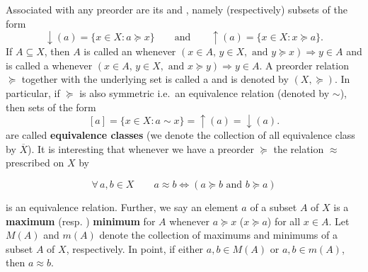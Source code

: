 \documentclass[
  letterpaper,
  10pt,
  reqno,
  twopage,
  openany]{book}
\theoremstyle{plain}
\theoremstyle{definition}
\theoremstyle{definition}
\theoremstyle{definition}
\theoremstyle{plain}
\theoremstyle{plain}
\theoremstyle{remark}
\begin{document}
Associated with any preorder are its  and
, namely (respectively) subsets of the form \[
{{\downarrow}(a) = \{x\in X : a\succeq x\}}
\qquad \text{and} \qquad 
{{\uparrow}(a) = \{x\in X : x\succeq a\}}. 
\] If \(A\subseteq X\), then \(A\) is called an  whenever
\((x\in A, \, y\in X, \text{ and } y\succeq x) \Rightarrow y\in A\) and
is called a  whenever
\((x\in A, \, y\in X, \text{ and } x\succeq y) \Rightarrow y\in A\). A
preorder relation \(\succeq\) together with the underlying set is called
a  and is denoted by \({(X,\succeq)}\). In
particular, if \(\succeq\) is also symmetric i.e.~an equivalence
relation (denoted by \(\sim\)), then sets of the form\\
\[
[a] = \{x \in X : a\sim x\} = {\uparrow}(a) = {\downarrow}(a). 
\] are called  \textbf{equivalence classes}
(we denote the collection of all equivalence class by \(\overline{X}\)).
It is interesting that whenever we have a preorder \(\succeq\) the
relation \(\approx\) prescribed on \(X\) by

\begin{equation}
\forall \, a,b \in X \qquad
a\approx b \Leftrightarrow (a\succeq b \text{ and } b\succeq a)
\end{equation}

is an equivalence relation. Further, we say an element \(a\) of a subset
\(A\) of \(X\) is a  \textbf{maximum} (resp.
) \textbf{minimum} for \(A\) whenever \(a\succeq x\)
(\(x \succeq a\)) for all \(x\in A\). Let \(M(A)\) and \(m(A)\) denote
the collection of maximums and minimums of a subset \(A\) of \(X\),
respectively. In point, if either \(a,b\in M(A)\) or \(a,b\in m(A)\),
then \(a\approx b\).
\end{document}
